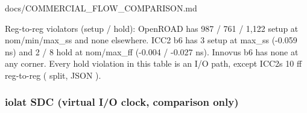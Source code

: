 \begin{relocated}{docs/COMMERCIAL_FLOW_COMPARISON.md}
{}

Reg-to-reg violators (setup / hold): OpenROAD has 987 / 761 / 1,122
setup at nom/\allowbreak{}min/\allowbreak{}max\_\allowbreak{}ss and none
elsewhere. ICC2 b6 has 3 setup at max\_ss (-0.059 ns) and 2 / 8 hold at
nom/\allowbreak{}max\_\allowbreak{}ff (-0.004 / -0.027 ns). Innovus b6
has none at any corner. Every hold violation in this table is an I/O
path, except ICC2\textquotesingle s 10 ff reg-to-reg
( split, JSON ).

\subsubsection{iolat SDC (virtual I/O clock, comparison only)}\label{tm:pd:commercial-flow-comparison:42-iolat-sdc-virtual-io-clock-comparison-only}

{\small\setlength{\tabcolsep}{4pt}

}
\end{relocated}
